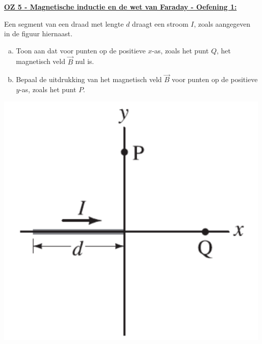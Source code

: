 \textbf{\underline{OZ 5 - Magnetische inductie en de wet van Faraday - Oefening 1:}}
\vspace{0.5cm}

\begin{minipage}{0.76\textwidth}
    Een segment van een draad met lengte $d$ draagt een stroom $I$, zoals aangegeven in de figuur hiernaast.

    \begin{enumerate}[(a)]
        \item 
            Toon aan dat voor punten op de positieve $x$-as, zoals het punt $Q$, het magnetisch veld $\Vec{B}$ nul is.
        \item 
            Bepaal de uitdrukking van het magnetisch veld $\Vec{B}$ voor punten op de positieve $y$-as, zoals het punt $P$.
    \end{enumerate}
\end{minipage}
\begin{minipage}{0.2\textwidth}
    \begin{center}
        \includegraphics[scale = 0.35]{oz05/resources/Oz5Oef1.png}
    \end{center}
\end{minipage}

